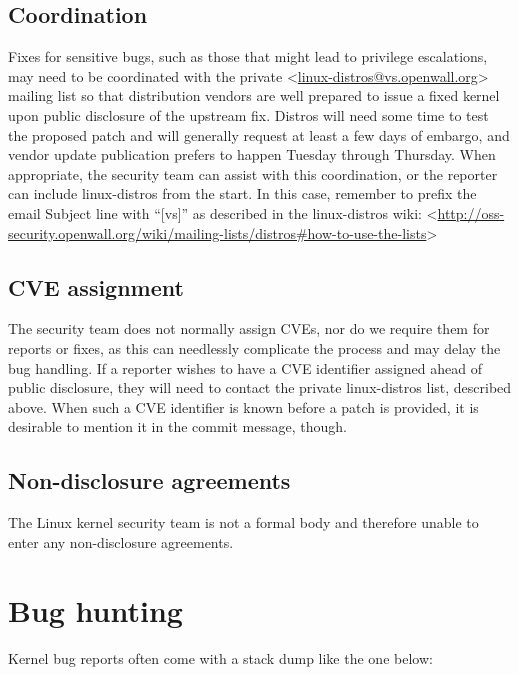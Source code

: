 \documentclass[a4paper,8pt,english]{sphinxmanual}
\begin{document}
\section{Coordination}
\label{admin-guide/security-bugs:coordination}
Fixes for sensitive bugs, such as those that might lead to privilege
escalations, may need to be coordinated with the private
\textless{}\href{mailto:linux-distros@vs.openwall.org}{linux-distros@vs.openwall.org}\textgreater{} mailing list so that distribution vendors
are well prepared to issue a fixed kernel upon public disclosure of the
upstream fix. Distros will need some time to test the proposed patch and
will generally request at least a few days of embargo, and vendor update
publication prefers to happen Tuesday through Thursday. When appropriate,
the security team can assist with this coordination, or the reporter can
include linux-distros from the start. In this case, remember to prefix
the email Subject line with ``{[}vs{]}'' as described in the linux-distros wiki:
\textless{}\href{http://oss-security.openwall.org/wiki/mailing-lists/distros\#how-to-use-the-lists}{http://oss-security.openwall.org/wiki/mailing-lists/distros\#how-to-use-the-lists}\textgreater{}


\section{CVE assignment}
\label{admin-guide/security-bugs:cve-assignment}
The security team does not normally assign CVEs, nor do we require them
for reports or fixes, as this can needlessly complicate the process and
may delay the bug handling. If a reporter wishes to have a CVE identifier
assigned ahead of public disclosure, they will need to contact the private
linux-distros list, described above. When such a CVE identifier is known
before a patch is provided, it is desirable to mention it in the commit
message, though.


\section{Non-disclosure agreements}
\label{admin-guide/security-bugs:non-disclosure-agreements}
The Linux kernel security team is not a formal body and therefore unable
to enter any non-disclosure agreements.


\chapter{Bug hunting}
\label{admin-guide/bug-hunting::doc}\label{admin-guide/bug-hunting:bug-hunting}
Kernel bug reports often come with a stack dump like the one below:
\end{document}
